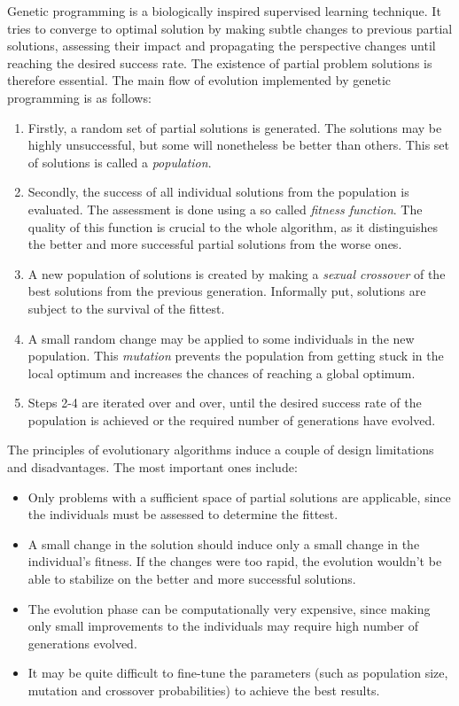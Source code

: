 \documentclass[12pt,oneside]{fithesis2}
\newcommand{\squarebullet}{\textcolor{black}{\raisebox{0.15em}{\rule{4pt}{4pt}}}}
\newenvironment{myItemize}{
  \begin{itemize}[leftmargin=2em,rightmargin=1em,itemsep=\parskip ,parsep=0em,topsep=0em,partopsep=0em]
  \renewcommand{\labelitemi}{\squarebullet}
  \renewcommand{\labelitemii}{$\diamond$}
}{
  \end{itemize}
}
\begin{document}
Genetic programming \parencite{genetic-programming} is a biologically inspired supervised learning technique. 
It tries to converge to optimal 
solution by making subtle changes to previous partial solutions, assessing their impact and propagating the perspective changes
until reaching the desired success rate. The existence of partial problem solutions is therefore essential.
The main flow of evolution implemented by genetic programming is as follows:
\begin{enumerate} \rightskip=2em
\item Firstly, a random set of partial solutions is generated. The solutions may be highly unsuccessful,
but some will nonetheless be better than others. This set of solutions is called a \textit{population}.
\item Secondly, the success of all individual solutions from the population is evaluated. The assessment is done using
a so called \textit{fitness function}. The quality of this function is crucial to the whole algorithm, as it
distinguishes the better and more successful partial solutions from the worse ones.
\item A new population of solutions is created by making a \textit{sexual crossover} of the best solutions from the 
previous generation. Informally put, solutions are subject to the survival of the fittest.
\item A small random change may be applied to some individuals in the new population. This \textit{mutation} prevents
the population from getting stuck in the local optimum and increases the chances of reaching a global optimum.
\item Steps 2-4 are iterated over and over, until the desired success rate of the population is achieved or the
required number of generations have evolved.
\end{enumerate}

\noindent
The principles of evolutionary algorithms induce a couple of design limitations and disadvantages. 
The most important ones include:
\begin{myItemize}
\item Only problems with a sufficient space of partial solutions are applicable, since the individuals must be assessed 
to determine the fittest.
\item A small change in the solution should induce only a small change in the individual's fitness. If the changes were
too rapid, the evolution wouldn't be able to stabilize on the better and more successful solutions.
\item The evolution phase can be computationally very expensive, since making only small improvements to the individuals may require
high number of generations evolved.
\item It may be quite difficult to fine-tune the parameters (such as population size, mutation and crossover probabilities)
to achieve the best results.
\end{myItemize}
\end{document}
